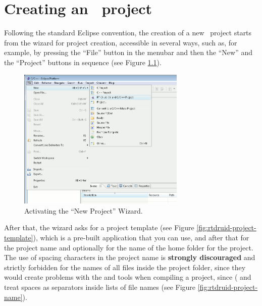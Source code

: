 \chapter{Creating an \rtd\ project}
\label{cha:creating-rtdruid-project}

Following the standard Eclipse convention, the creation of a new \rtd\
project starts from the wizard for project creation, accessible in
several ways, such as, for example, by pressing the ``File'' button in
the menubar and then the ``New'' and the ``Project'' buttons in
sequence (see Figure \ref{fig:rtdruid-project-new}).

\begin{figure}
  \begin{center}
    \includegraphics[width=8cm, bb=0 0 707 598]{images/project_new.png}
  \end{center}
  \caption{Activating the ``New Project'' Wizard.}
  \label{fig:rtdruid-project-new}
\end{figure}

After that, the wizard asks for a project template (see Figure
\ref{fig:rtdruid-project-template}), which is a pre-built application
that you can use, and after that for the project name and optionally
for the name of the home folder for the project. The use of spacing
characters in the project name is {\bf strongly discouraged} and
strictly forbidden for the names of all files inside the project
folder, since they would create problems with the
 and  tools when compiling a project, since (
and \file{gcc} treat spaces as separators inside lists of file names
(see Figure \ref{fig:rtdruid-project-name}).

